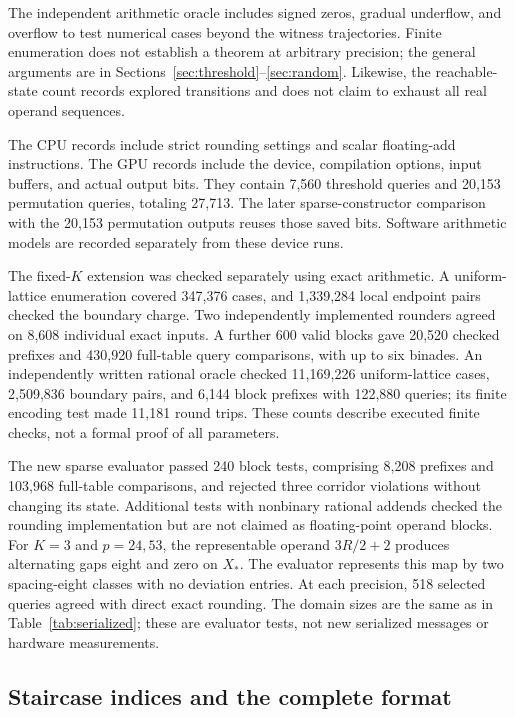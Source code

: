 \documentclass[11pt,reqno]{amsart}
\theoremstyle{definition}
\theoremstyle{remark}
\numberwithin{equation}{section}
\begin{document}
The independent arithmetic oracle includes signed zeros, gradual underflow,
and overflow to test numerical cases beyond the witness trajectories.
Finite enumeration does not establish a theorem at arbitrary precision; the
general arguments are in Sections~\ref{sec:threshold}--\ref{sec:random}.
Likewise, the reachable-state count records explored transitions and does not
claim to exhaust all real operand sequences.

The CPU records include strict rounding settings and scalar floating-add
instructions. The GPU records include the device, compilation options, input
buffers, and actual output bits. They contain 7,560 threshold queries and
20,153 permutation queries, totaling 27,713. The later sparse-constructor
comparison with the 20,153 permutation outputs reuses those saved bits.
Software arithmetic models are recorded separately from these device runs.

The fixed-$K$ extension was checked separately using exact arithmetic. A
uniform-lattice enumeration covered 347,376 cases, and 1,339,284 local
endpoint pairs checked the boundary charge. Two independently implemented
rounders agreed on 8,608 individual exact inputs. A further 600 valid blocks
gave 20,520 checked prefixes and 430,920 full-table query comparisons, with
up to six binades. An independently written rational oracle checked
11,169,226 uniform-lattice cases, 2,509,836 boundary pairs, and 6,144 block
prefixes with 122,880 queries; its finite encoding test made 11,181 round
trips. These counts describe executed finite checks, not a formal proof of
all parameters.

The new sparse evaluator passed 240 block tests, comprising 8,208 prefixes
and 103,968 full-table comparisons, and rejected three corridor violations
without changing its state. Additional tests with nonbinary rational
addends checked the rounding implementation but are not claimed as
floating-point operand blocks. For $K=3$ and $p=24,53$, the representable
operand $3R/2+2$ produces alternating gaps eight and zero on $X_\ast$.
The evaluator represents this map by two spacing-eight classes with no
deviation entries. At each precision, 518 selected queries agreed with
direct exact rounding. The domain sizes are the same as in
Table~\ref{tab:serialized}; these are evaluator tests, not new serialized
messages or hardware measurements.

\subsection{Staircase indices and the complete format}
\end{document}

